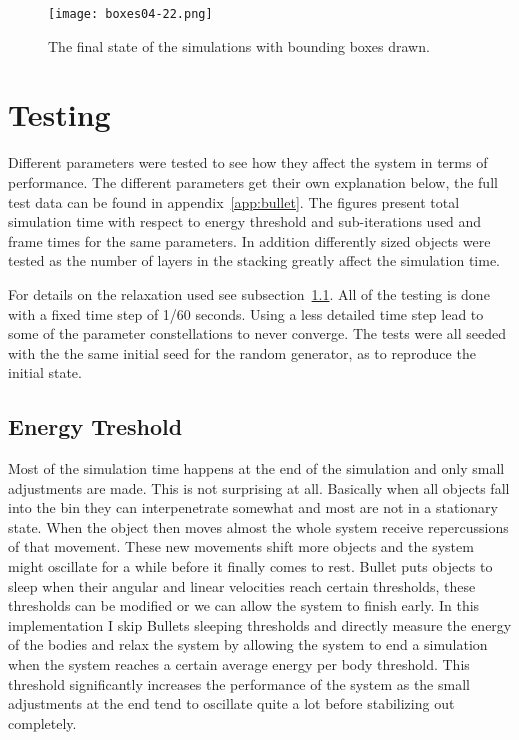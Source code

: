 \begin{figure}[H]
  \centering
  \texttt{[image: boxes04-22.png]}
  \caption{The final state of the simulations with bounding boxes drawn.}
  \label{fig:stopStackBoxes}
\end{figure}

\section{Testing}\label{sec:testing}
Different parameters were tested to see how they affect the system in terms of performance.
The different parameters get their own explanation below, the full test data can be found in appendix~\ref{app:bullet}.
The figures present total simulation time with respect to energy threshold and sub-iterations used and
frame times for the same parameters. In addition differently sized objects were tested
as the number of layers in the stacking greatly affect the simulation time.

For details on the relaxation used see subsection~\ref{subsec:relax}.
All of the testing is done with a fixed time step of 1/60 seconds. Using a less detailed
time step lead to some of the parameter constellations to never converge.
The tests were all seeded with the the same initial seed for the random generator,
as to reproduce the initial state.

\subsection{Energy Treshold}\label{subsec:relax}
Most of the simulation time happens at the end of the simulation and only small
adjustments are made. This is not surprising at all. Basically when all objects
fall into the bin they can interpenetrate somewhat and most are not in
a stationary state. When the object then moves almost the whole system receive
repercussions of that movement. These new movements shift more objects and the
system might oscillate for a while before it finally comes to rest.
Bullet puts objects to sleep when their angular and linear velocities reach certain
thresholds, these thresholds can be modified or we can
allow the system to finish early. In this implementation I skip Bullets sleeping
thresholds and directly measure the energy of the bodies and relax the system by
allowing the system to end a simulation when the system reaches a certain
average energy per body threshold. This threshold significantly increases the performance
of the system as the small adjustments at the end tend to oscillate quite a lot before
stabilizing out completely.

